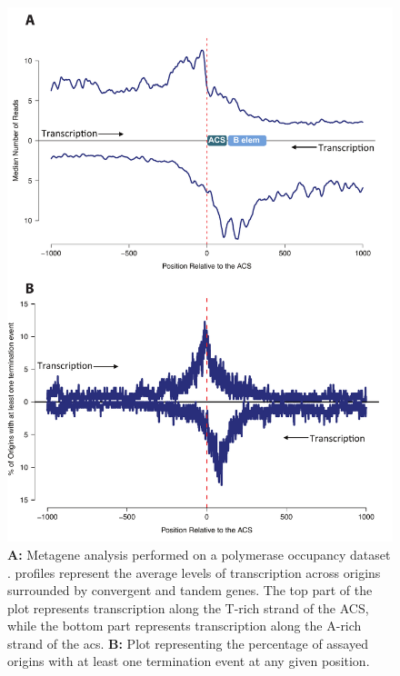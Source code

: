 \begin{figure}[hp]

\centering
\includegraphics[width=\textwidth]{figures/results/metagenes}
\caption[Metagene analyses showing polymerase occupancy and termination around replication origins]{\textbf{A: }Metagene analysis performed on a polymerase occupancy dataset \cite{schaughency:2014:genomewide}. profiles represent the average levels of transcription across origins surrounded by convergent and tandem genes. The top part of the plot represents transcription along the T-rich strand of the ACS, while the bottom part represents transcription along the A-rich strand of the acs. \textbf{B: } Plot representing the percentage of assayed origins with at least one termination event at any given position. }
\label{fig:metagenes}

\end{figure}  
  
